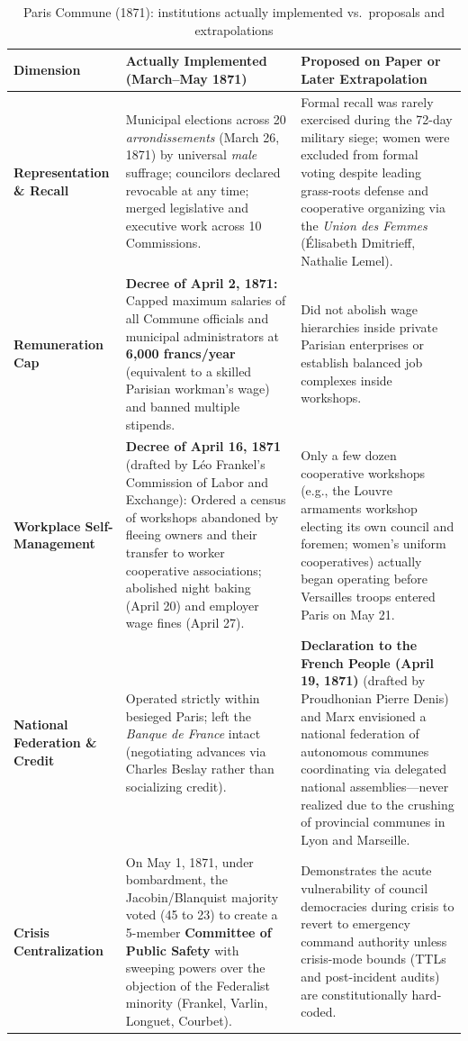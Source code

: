 \documentclass[10pt,twoside,openany]{book}
\theoremstyle{dpepstyle}
\begin{document}
\begin{table}[htbp]
\centering
\caption{Paris Commune (1871): institutions actually implemented vs.\ proposals and extrapolations}
\label{tab:paris-commune}
\footnotesize
\setlength{\tabcolsep}{3.5pt}
\begin{tabularx}{\textwidth}{L{0.95in} L{1.85in} Y}
\toprule
\textbf{Dimension} & \textbf{Actually Implemented (March--May 1871)} & \textbf{Proposed on Paper or Later Extrapolation} \\
\midrule
\textbf{Representation \& Recall} & Municipal elections across 20 \emph{arrondissements} (March 26, 1871) by universal \emph{male} suffrage; councilors declared revocable at any time; merged legislative and executive work across 10 Commissions.\footnotemark & Formal recall was rarely exercised during the 72-day military siege; women were excluded from formal voting despite leading grass-roots defense and cooperative organizing via the \emph{Union des Femmes} (\'Elisabeth Dmitrieff, Nathalie Lemel). \\
\addlinespace[4pt]
\textbf{Remuneration Cap} & \textbf{Decree of April 2, 1871:} Capped maximum salaries of all Commune officials and municipal administrators at \textbf{6,000 francs/year} (equivalent to a skilled Parisian workman's wage) and banned multiple stipends. & Did not abolish wage hierarchies inside private Parisian enterprises or establish balanced job complexes inside workshops. \\
\addlinespace[4pt]
\textbf{Workplace Self-Management} & \textbf{Decree of April 16, 1871} (drafted by L\'eo Frankel's Commission of Labor and Exchange): Ordered a census of workshops abandoned by fleeing owners and their transfer to worker cooperative associations; abolished night baking (April 20) and employer wage fines (April 27).\footnotemark & Only a few dozen cooperative workshops (e.g., the Louvre armaments workshop electing its own council and foremen; women's uniform cooperatives) actually began operating before Versailles troops entered Paris on May 21. \\
\addlinespace[4pt]
\textbf{National Federation \& Credit} & Operated strictly within besieged Paris; left the \emph{Banque de France} intact (negotiating advances via Charles Beslay rather than socializing credit). & \textbf{Declaration to the French People (April 19, 1871)} (drafted by Proudhonian Pierre Denis) and Marx envisioned a national federation of autonomous communes coordinating via delegated national assemblies---never realized due to the crushing of provincial communes in Lyon and Marseille. \\
\addlinespace[4pt]
\textbf{Crisis Centralization} & On May 1, 1871, under bombardment, the Jacobin/Blanquist majority voted (45 to 23) to create a 5-member \textbf{Committee of Public Safety} with sweeping powers over the objection of the Federalist minority (Frankel, Varlin, Longuet, Courbet). & Demonstrates the acute vulnerability of council democracies during crisis to revert to emergency command authority unless crisis-mode bounds (TTLs and post-incident audits) are constitutionally hard-coded. \\
\bottomrule
\end{tabularx}
\end{table}
\end{document}
